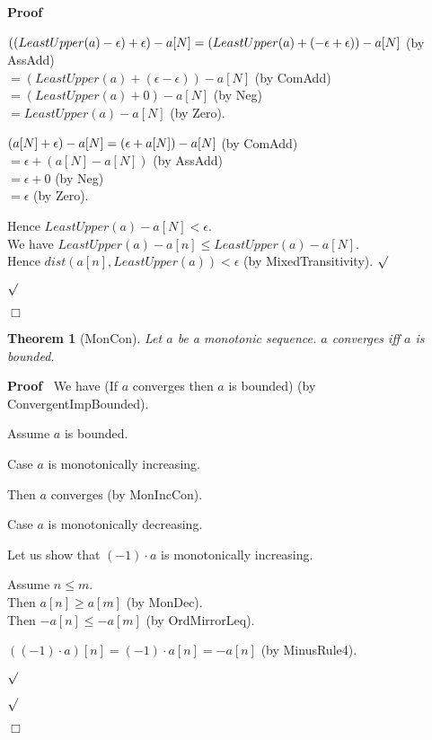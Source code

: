 \documentclass{article}
\newenvironment{forthel}{\begin{leftbar}}{\end{leftbar}}
\newenvironment{proof}{\noindent\textbf{Proof\ }}{\hspace*{\fill}$\Box$\medskip}
\newenvironment{subproof}{\begin{list}{}{}
		\item[\text{Proof}]}{\hfill $\surd$ \end{list}}
\newenvironment{case}{\begin{list}{}{}
		\item[]}{\end{list}}
\newtheorem{theorem}{Theorem}
\newcommand{\cdottwo}{\cdot}
\newcommand{\dotequal}{=}
\begin{document}
\begin{forthel}
\begin{proof}
\begin{subproof}
\begin{subproof}
				$((LeastUpper(a) - \epsilon) + \epsilon) - a[N]\\
				\dotequal (LeastUpper(a) + (-\epsilon + \epsilon)) - a[N]$ (by AssAdd)\\
				$\dotequal (LeastUpper(a) + (\epsilon - \epsilon)) - a[N]$ (by ComAdd)\\
				$\dotequal (LeastUpper(a) + 0) - a[N]$ (by Neg)\\
				$\dotequal LeastUpper(a) - a[N]$ (by Zero).
				
				$(a[N] + \epsilon) - a[N]\\ \dotequal (\epsilon + a[N]) - a[N]$ (by ComAdd)\\
				$\dotequal \epsilon + (a[N] - a[N])$ (by AssAdd)\\
				$\dotequal \epsilon + 0$ (by Neg)\\
				$\dotequal \epsilon$ (by Zero).
				
				Hence $LeastUpper(a) - a[N] < \epsilon$.\\
				We have $LeastUpper(a) - a[n] \leq LeastUpper(a) - a[N]$.\\
				Hence $dist(a[n],LeastUpper(a)) < \epsilon$ (by MixedTransitivity).
			\end{subproof}
		\end{subproof}
	\end{proof}
	
	\begin{theorem}[MonCon]
		Let $a$ be a monotonic sequence. $a$ converges iff $a$ is bounded.
	\end{theorem}
	
	\begin{proof}
		We have (If $a$ converges then $a$ is bounded) (by ConvergentImpBounded).
		
		\noindent Assume $a$ is bounded.
		
		\noindent Case $a$ is monotonically increasing.
		\begin{case}
			Then $a$ converges (by MonIncCon). 
		\end{case} 
		Case $a$ is monotonically decreasing.
		\begin{subproof}
			Let us show that $(-1) \cdottwo a$ is monotonically increasing.
			
			\begin{subproof}
				Assume $n \leq m$.\\
				Then $a[n] \geq a[m]$ (by MonDec).\\
				Then $-a[n] \leq -a[m]$ (by OrdMirrorLeq).
				
				$((-1) \cdottwo a)[n] \dotequal (-1) \cdot a[n]
				\dotequal -a[n]$ (by MinusRule4).
				

\end{subproof}
\end{subproof}
\end{proof}
\end{forthel}
\end{document}

